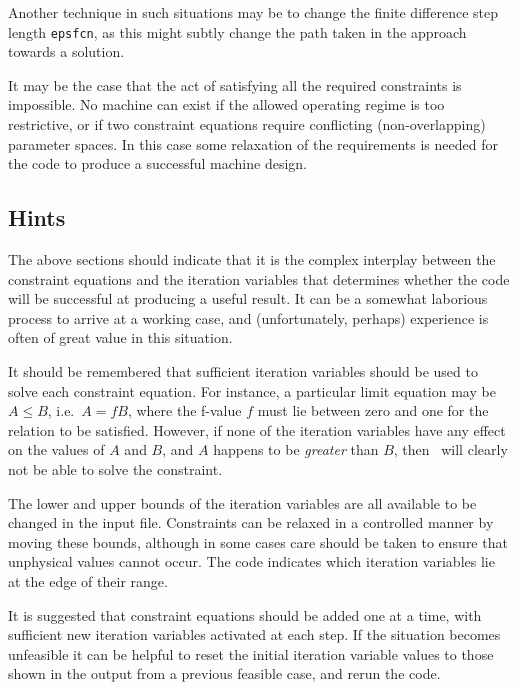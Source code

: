Another technique in such situations may be to change the finite difference
step length \texttt{epsfcn}, as this might subtly change the path taken in the
approach towards a solution.

It may be the case that the act of satisfying all the required constraints is
impossible. No machine can exist if the allowed operating regime is too
restrictive, or if two constraint equations require conflicting
(non-overlapping) parameter spaces. In this case some relaxation of the
requirements is needed for the code to produce a successful machine design.

\subsection{Hints}

The above sections should indicate that it is the complex interplay between
the constraint equations and the iteration variables that determines whether
the code will be successful at producing a useful result. It can be a somewhat
laborious process to arrive at a working case, and (unfortunately, perhaps)
experience is often of great value in this situation.

It should be remembered that sufficient iteration variables should be used to
solve each constraint equation. For instance, a particular limit equation may
be $A \leq B$, i.e.\ $A = fB$, where the f-value $f$ must lie between zero and
one for the relation to be satisfied.  However, if none of the iteration
variables have any effect on the values of $A$ and $B$, and $A$ happens to be
\textit{greater}\/ than $B$, then \process\ will clearly not be able to solve
the constraint.

The lower and upper bounds of the iteration variables are all available to be
changed in the input file. Constraints can be relaxed in a controlled manner
by moving these bounds, although in some cases care should be taken to ensure
that unphysical values cannot occur.  The code indicates which iteration
variables lie at the edge of their range.

It is suggested that constraint equations should be added one at a time, with
sufficient new iteration variables activated at each step.  If the situation
becomes unfeasible it can be helpful to reset the initial iteration variable
values to those shown in the output from a previous feasible case, and rerun
the code.

